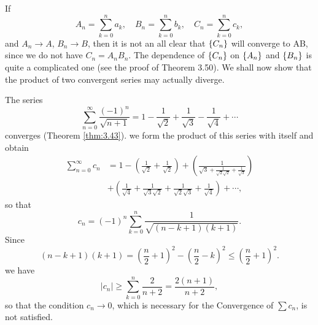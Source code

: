 \begin{myExample}
    If
    \begin{equation*}
        A_n = \sum_{k=0}^{n} a_k, \quad
        B_n = \sum_{k=0}^{n} b_k, \quad
        C_n = \sum_{k=0}^{n} c_k,
    \end{equation*}
    and 
    $A_n \rightarrow A$,
    $B_n \rightarrow B$,
    then it is not an all clear that $\protect\{C_n\}$ will converge to AB,
    since we do not have $C_n = A_n B_n$.
    The dependence of $\protect\{C_n\}$ on $\protect\{A_n\}$ and $\protect\{B_n\}$ 
    is quite a complicated one (see the proof of Theorem 3.50).
    We shall now show that the product of two convergent series may actually diverge.

    The series
    \begin{equation*}
        \sum_{n=0}^{\infty} \frac{(-1)^n}{\sqrt{n+1}} = 1
        - \frac{1}{\sqrt{2}} 
        + \frac{1}{\sqrt{3}}
        - \frac{1}{\sqrt{4}} 
        + \cdots
    \end{equation*}
    converges (Theorem \ref{thm:3.43}).
    we form the product of this series with itself and obtain
    \begin{align*}
        \sum_{n=0}^{\infty} c_n
        &= 1 - \left(
            \frac{1}{\sqrt{2}} 
            + \frac{1}{\sqrt{2}}
        \right) 
        + \left(
            \frac{1}{\sqrt{3} 
            + \frac{1}{\sqrt{2}\sqrt{2}} 
            + \frac{1}{\sqrt{3}}}
        \right) \\
        &+ \left(
            \frac{1}{\sqrt{4}}
            + \frac{1}{\sqrt{3}\sqrt{2}}
            + \frac{1}{\sqrt{2}\sqrt{3}}
            + \frac{1}{\sqrt{4}}
        \right) + \cdots,
    \end{align*}
    so that 
    \begin{equation*}
        c_n = (-1)^n \sum_{k=0}^{n}\frac{1}{\sqrt{(n-k+1)(k+1)}}.
    \end{equation*}
    Since
    \begin{equation*}
        (n-k+1)(k+1) =
        \left(\frac{n}{2} + 1 \right)^2 - 
        \left(\frac{n}{2} - k \right)^2
        \leq 
        \left(\frac{n}{2} + 1 \right)^2.
    \end{equation*}
    we have
    \begin{equation*}
        |c_n| \geq \sum_{k=0}^{n}\frac{2}{n+2} = \frac{2(n+1)}{n+2},
    \end{equation*}
    so that the condition $c_n \rightarrow 0$, which is necessary for the Convergence of $\sum c_n$, 
    is not satisfied.
\end{myExample}

